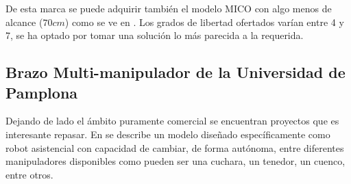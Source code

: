 	  De esta marca se puede adquirir también el modelo MICO con algo menos de alcance ($70cm$) como se ve en \cite{Mico:2018}. Los grados de libertad ofertados varían entre 4 y 7, se ha optado por tomar una solución lo más parecida a la requerida.

 \subsection{Brazo Multi-manipulador de la Universidad de Pamplona}

    Dejando de lado el ámbito puramente comercial se encuentran proyectos que es interesante repasar. En \cite{Marquez:2013} se describe un modelo diseñado específicamente como robot asistencial con capacidad de cambiar, de forma autónoma, entre diferentes manipuladores disponibles como pueden ser una cuchara, un tenedor, un cuenco, entre otros.
    \\

